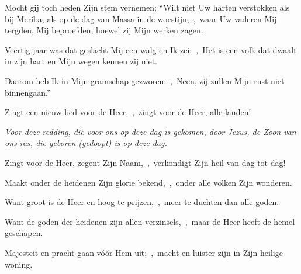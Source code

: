 \documentclass[12pt,twoside,a5paper]{article}
\begin{document}

\begin{halfparskip}
  Mocht gij toch heden Zijn stem vernemen; ``Wilt niet Uw harten verstokken als bij Meriba, als op de dag van Massa in de woestijn,~\sep\ waar Uw vaderen Mij tergden, Mij beproefden, hoewel zij Mijn werken zagen.

  Veertig jaar was dat geslacht Mij een walg en Ik zei:~\sep\ Het is een volk dat dwaalt in zijn hart en Mijn wegen kennen zij niet.

  Daarom heb Ik in Mijn gramschap gezworen:~\sep\ Neen, zij zullen Mijn rust niet binnengaan.''
\end{halfparskip}





\begin{halfparskip}
  Zingt een nieuw lied voor de Heer,~\sep\ zingt voor de Heer, alle landen!


   \emph{Voor deze redding, die voor ons op deze dag is gekomen, door Jezus, de Zoon van ons ras, die geboren (gedoopt) is op deze dag.}

  Zingt voor de Heer, zegent Zijn Naam,~\sep\ verkondigt Zijn heil van dag tot dag!

  Maakt onder de heidenen Zijn glorie bekend,~\sep\ onder alle volken Zijn wonderen.

  Want groot is de Heer en hoog te prijzen,~\sep\ meer te duchten dan alle goden.

  Want de goden der heidenen zijn allen verzinsels,~\sep\ maar de Heer heeft de hemel geschapen.

  Majesteit en pracht gaan vóór Hem uit;~\sep\ macht en luister zijn in Zijn heilige woning.
\end{halfparskip}

\end{document}

